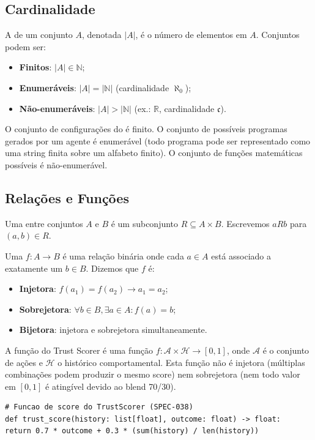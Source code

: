 \subsection{Cardinalidade}
\begin{definicao}[Cardinalidade]
A  de um conjunto $A$, denotada $|A|$, é o
número de elementos em $A$. Conjuntos podem ser:
\begin{itemize}
\item \textbf{Finitos}: $|A| \in \mathbb{N}$;
\item \textbf{Enumeráveis}: $|A| = |\mathbb{N}|$ (cardinalidade
$\aleph_0$);
\item \textbf{Não-enumeráveis}: $|A| > |\mathbb{N}|$ (ex.:
$\mathbb{R}$, cardinalidade $\mathfrak{c}$).
\end{itemize}
\end{definicao}
\begin{exemplo}
O conjunto de configurações do \opencodeeco{} é finito. O conjunto de
possíveis programas gerados por um agente é enumerável (todo programa
pode ser representado como uma string finita sobre um alfabeto finito).
O conjunto de funções matemáticas possíveis é não-enumerável.
\end{exemplo}
\subsection{Relações e Funções}
\begin{definicao}
Uma  entre conjuntos $A$ e $B$ é um subconjunto
$R \subseteq A \times B$. Escrevemos $aRb$ para $(a,b) \in R$.
\end{definicao}
\begin{definicao}[Função]
Uma  $f: A \to B$ é uma relação binária onde cada
$a \in A$ está associado a exatamente um $b \in B$. Dizemos que $f$ é:
\begin{itemize}
\item \textbf{Injetora}: $f(a_1) = f(a_2) \to a_1 = a_2$;
\item \textbf{Sobrejetora}: $\forall b \in B, \exists a \in A: f(a) = b$;
\item \textbf{Bijetora}: injetora e sobrejetora simultaneamente.
\end{itemize}
\end{definicao}
\begin{exemplo}
A função  do Trust Scorer é uma função
$f: \mathcal{A} \times \mathcal{H} \to [0,1]$, onde $\mathcal{A}$ é o
conjunto de ações e $\mathcal{H}$ o histórico comportamental. Esta
função não é injetora (múltiplas combinações podem produzir o mesmo
score) nem sobrejetora (nem todo valor em $[0,1]$ é atingível devido
ao blend 70/30).
\end{exemplo}
\begin{lstlisting}[style=pythonstyle]
# Funcao de score do TrustScorer (SPEC-038)
def trust_score(history: list[float], outcome: float) -> float:
return 0.7 * outcome + 0.3 * (sum(history) / len(history))
\end{lstlisting}

